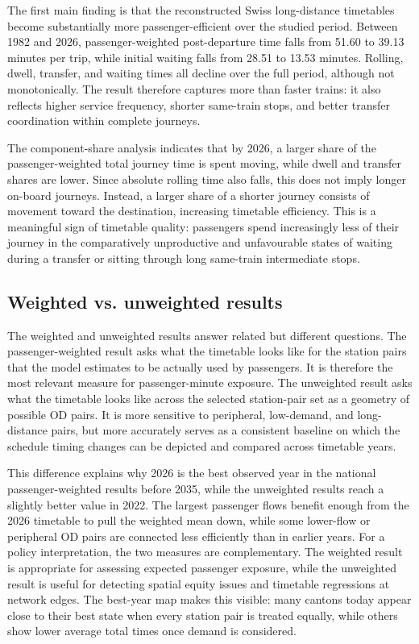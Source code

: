 \documentclass[preprint,12pt]{elsarticle}
\begin{document}
The first main finding is that the reconstructed Swiss long-distance timetables become substantially more passenger-efficient over the studied period. Between 1982 and 2026, passenger-weighted post-departure time falls from 51.60 to 39.13 minutes per trip, while initial waiting falls from 28.51 to 13.53 minutes. Rolling, dwell, transfer, and waiting times all decline over the full period, although not monotonically. The result therefore captures more than faster trains: it also reflects higher service frequency, shorter same-train stops, and better transfer coordination within complete journeys.

The component-share analysis indicates that by 2026, a larger share of the passenger-weighted total journey time is spent moving, while dwell and transfer shares are lower. Since absolute rolling time also falls, this does not imply longer on-board journeys. Instead, a larger share of a shorter journey consists of movement toward the destination, increasing timetable efficiency. This is a meaningful sign of timetable quality: passengers spend increasingly less of their journey in the comparatively unproductive and unfavourable states of waiting during a transfer or sitting through long same-train intermediate stops.

\subsection{Weighted vs. unweighted results}\label{sec:discussion-part1-weighting}

The weighted and unweighted results answer related but different questions. The passenger-weighted result asks what the timetable looks like for the station pairs that the model estimates to be actually used by passengers. It is therefore the most relevant measure for passenger-minute exposure. The unweighted result asks what the timetable looks like across the selected station-pair set as a geometry of possible OD pairs. It is more sensitive to peripheral, low-demand, and long-distance pairs, but more accurately serves as a consistent baseline on which the schedule timing changes can be depicted and compared across timetable years.

This difference explains why 2026 is the best observed year in the national passenger-weighted results before 2035, while the unweighted results reach a slightly better value in 2022. The largest passenger flows benefit enough from the 2026 timetable to pull the weighted mean down, while some lower-flow or peripheral OD pairs are connected less efficiently than in earlier years. For a policy interpretation, the two measures are complementary. The weighted result is appropriate for assessing expected passenger exposure, while the unweighted result is useful for detecting spatial equity issues and timetable regressions at network edges. The best-year map makes this visible: many cantons today appear close to their best state when every station pair is treated equally, while others show lower average total times once demand is considered.
\end{document}
